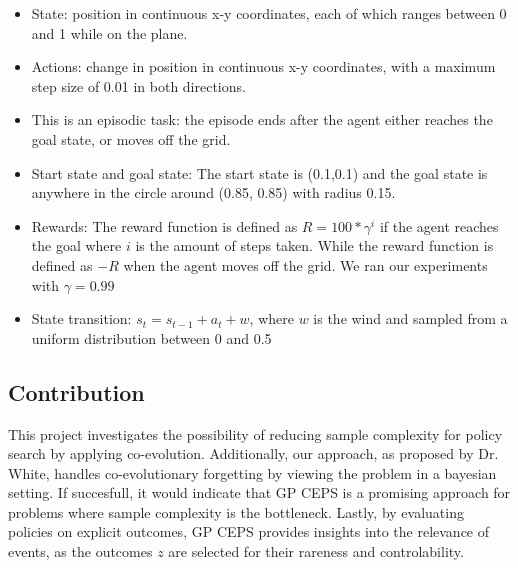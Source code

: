 \begin{itemize}
\item State: position in continuous x-y coordinates, each of which ranges between 0 and 1 while on the plane.
\item Actions: change in position in continuous x-y coordinates, with a maximum step size of 0.01 in both directions. 
\item This is an episodic task: the episode ends after the agent either reaches the goal state, or moves off the grid.
\item Start state and goal state: The start state is (0.1,0.1) and the goal state is anywhere in the circle around (0.85, 0.85) with radius 0.15.
\item Rewards: The reward function is defined as $R = 100 * \gamma^{i}$ if the agent reaches the goal where $i$ is the amount of steps taken. While the reward function is defined as $-R$ when the agent moves off the grid. We ran our experiments with $\gamma = 0.99$
\item State transition: $s_t = s_{t-1} + a_t + w$, where $w$ is the wind and sampled from a uniform distribution between 0 and 0.5
\end{itemize} 

\subsection{Contribution}
This project investigates the possibility of reducing sample complexity for policy search by applying co-evolution. Additionally, our approach, as proposed by Dr. White, handles co-evolutionary forgetting by viewing the problem in a bayesian setting. If succesfull, it would indicate that GP CEPS is a promising approach for problems where sample complexity is the bottleneck. Lastly, by evaluating policies on explicit outcomes, GP CEPS provides insights into the relevance of events, as the outcomes $z$ are selected for their rareness and controlability.


